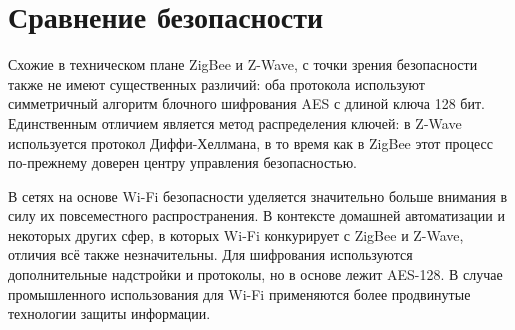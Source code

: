 	
	\section{Сравнение безопасности}
	
	Схожие в техническом плане ZigBee и Z-Wave, с точки зрения безопасности также не имеют
	существенных различий: оба протокола используют симметричный алгоритм блочного шифрования
	AES с длиной ключа 128 бит. Единственным отличием является метод распределения ключей: в Z-Wave
	используется протокол Диффи-Хеллмана, в то время как в ZigBee этот процесс по-прежнему доверен
	центру управления безопасностью.
	
	В сетях на основе Wi-Fi безопасности уделяется значительно больше внимания в силу их повсеместного
	распространения. В контексте домашней автоматизации и некоторых других сфер, в которых Wi-Fi
	конкурирует с ZigBee и Z-Wave, отличия всё также незначительны. Для шифрования используются
	дополнительные надстройки и протоколы, но в основе лежит AES-128. В случае промышленного
	использования для Wi-Fi применяются более продвинутые технологии защиты информации.
	